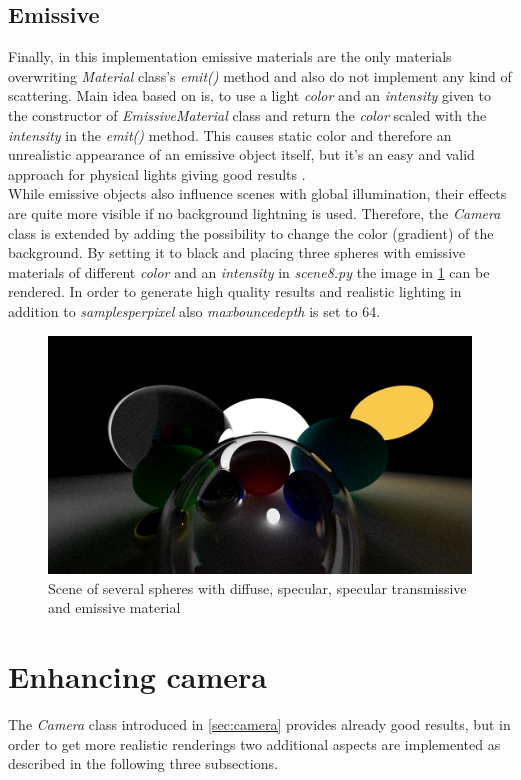 \documentclass[]{article}
\begin{document}
		\subsection{Emissive}
		Finally, in this implementation emissive materials are the only materials overwriting \emph{Material} class's \emph{emit()} method and also do not implement any kind of scattering. Main idea based on \cite{Shirley2020RTW2} is, to use a light \emph{color} and an \emph{intensity} given to the constructor of \emph{EmissiveMaterial} class and return the \emph{color} scaled with the \emph{intensity} in the \emph{emit()} method. This causes static color and therefore an unrealistic appearance of an emissive object itself, but it's an easy and valid approach for physical lights giving good results .
		\\
		While emissive objects also influence scenes with global illumination, their effects are quite more visible if no background lightning is used. Therefore, the \emph{Camera} class is extended by adding the possibility to change the color (gradient) of the background. By setting it to black and placing three spheres with emissive materials of different \emph{color} and an \emph{intensity} in \emph{scene8.py} the image in \cref{fig:image8} can be rendered. In order to generate high quality results and realistic lighting in addition to \emph{samples\textunderscore per\textunderscore pixel} also \emph{max\textunderscore bounce\textunderscore depth} is set to 64.
		
		\begin{figure}[h]
			\centering
			\includegraphics[width=0.9\linewidth]{image8}
			\caption{Scene of several spheres with diffuse, specular, specular transmissive and emissive material}
			\label{fig:image8}
		\end{figure}
		
	\section{Enhancing camera}
		The \emph{Camera} class introduced in \cref{sec:camera} provides already good results, but in order to get more realistic renderings two additional aspects are implemented as described in the following three subsections.
		
\end{document}
